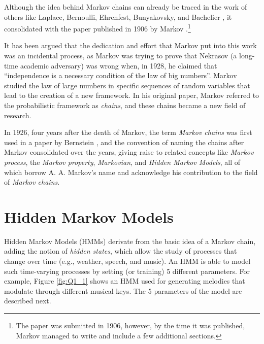 Although the idea behind Markov chains can already be traced in the work of others like Laplace, Bernoulli, Ehrenfest, Bunyakovsky, and Bachelier \cite{basharin_life_2004}, it consolidated with the paper published in 1906 by Markov \cite{markov_rasprostranenie_1906}.\footnote{The paper was submitted in 1906, however, by the time it was published, Markov managed to write and include a few additional sections.}

It has been argued that the dedication and effort that Markov put into this work was an incidental process, as Markov was trying to prove that Nekrasov (a long-time academic adversary) was wrong when, in 1928, he claimed that ``independence is a necessary condition of the law of big numbers''. Markov studied the law of large numbers in specific sequences of random variables that lead to the creation of a new framework. In his original paper, Markov referred to the probabilistic framework as \emph{chains}, and these chains became a new field of research.

In 1926, four years after the death of Markov, the term \emph{Markov chains} was first used in a paper by Bernstein \cite{bernstein_sur_1927}, and the convention of naming the chains after Markov consolidated over the years, giving raise to related concepts like \emph{Markov process}, the \emph{Markov property}, \emph{Markovian}, and \emph{Hidden Markov Models}, all of which borrow A. A. Markov's name and acknowledge his contribution to the field of \emph{Markov chains}.

\section{Hidden Markov Models}

Hidden Markov Models (HMMs) derivate from the basic idea of a Markov chain, adding the notion of \emph{hidden states}, which allow the study of processes that change over time (e.g., weather, speech, and music). An HMM is able to model such time-varying processes by setting (or training) 5 different parameters. For example, Figure \ref{fig:Q1_1} shows an HMM used for generating melodies that modulate through different musical keys. The 5 parameters of the model are described next.

